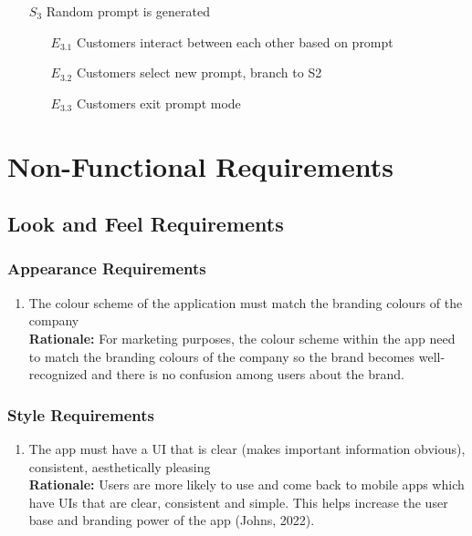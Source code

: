 \documentclass[]{article}
\begin{document}
\begin{enumerate}[{\textbf{BE}}1.]
\begin{enumerate}[{VP6}.1]
\begin{enumerate}
                \item[$S_3$] Random prompt is generated
                \begin{enumerate}
                    \item[$E_{3.1}$] Customers interact between each other based on prompt
                    \item[$E_{3.2}$] Customers select new prompt, branch to S2
                    \item[$E_{3.3}$] Customers exit prompt mode
                \end{enumerate}
            \end{enumerate}
    \end{enumerate}
\end{enumerate}

\section{Non-Functional Requirements}
\label{sec:non-functional_requirements}

\subsection{Look and Feel Requirements}
\label{sub:look_and_feel_requirements}

\subsubsection{Appearance Requirements}
\label{ssub:appearance_requirements}
\begin{enumerate}[{LF-A}1. ]
	\item The colour scheme of the application must match the branding colours of the company \\
	{\bf Rationale:} For marketing purposes, the colour scheme within the app need to match the branding colours of the company so the brand becomes well-recognized and there is no confusion among users about the brand.
\end{enumerate}

\subsubsection{Style Requirements}
\label{ssub:style_requirements}
\begin{enumerate}[{LF-S}1. ]
	\item The app must have a UI that is clear (makes important information obvious), consistent, aesthetically pleasing \\
	{\bf Rationale:} Users are more likely to use and come back to mobile apps which have UIs that are clear, consistent and simple. This helps increase the user base and branding power of the app (Johns, 2022). 
\end{enumerate}
\end{document}
